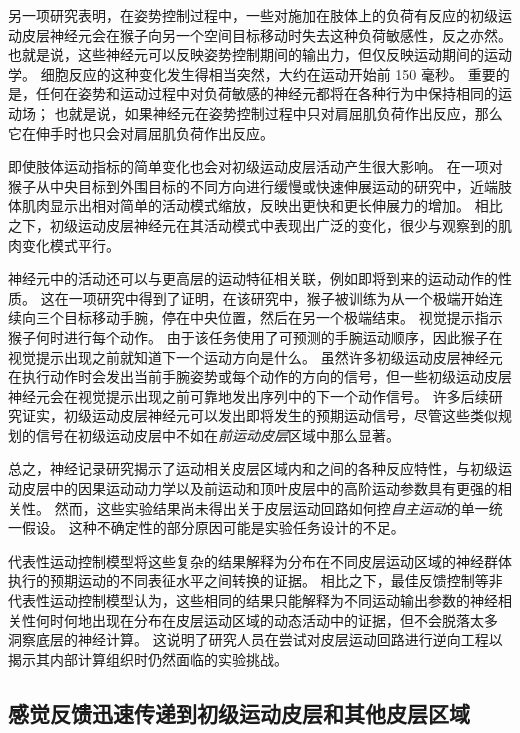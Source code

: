 另一项研究表明，在姿势控制过程中，一些对施加在肢体上的负荷有反应的初级运动皮层神经元会在猴子向另一个空间目标移动时失去这种负荷敏感性，反之亦然。
也就是说，这些神经元可以反映姿势控制期间的输出力，但仅反映运动期间的运动学。
细胞反应的这种变化发生得相当突然，大约在运动开始前 150 毫秒。
重要的是，任何在姿势和运动过程中对负荷敏感的神经元都将在各种行为中保持相同的运动场；
也就是说，如果神经元在姿势控制过程中只对肩屈肌负荷作出反应，那么它在伸手时也只会对肩屈肌负荷作出反应。


即使肢体运动指标的简单变化也会对初级运动皮层活动产生很大影响。
在一项对猴子从中央目标到外围目标的不同方向进行缓慢或快速伸展运动的研究中，近端肢体肌肉显示出相对简单的活动模式缩放，反映出更快和更长伸展力的增加。
相比之下，初级运动皮层神经元在其活动模式中表现出广泛的变化，很少与观察到的肌肉变化模式平行。


神经元中的活动还可以与更高层的运动特征相关联，例如即将到来的运动动作的性质。 
这在一项研究中得到了证明，在该研究中，猴子被训练为从一个极端开始连续向三个目标移动手腕，停在中央位置，然后在另一个极端结束。
视觉提示指示猴子何时进行每个动作。
由于该任务使用了可预测的手腕运动顺序，因此猴子在视觉提示出现之前就知道下一个运动方向是什么。
虽然许多初级运动皮层神经元在执行动作时会发出当前手腕姿势或每个动作的方向的信号，但一些初级运动皮层神经元会在视觉提示出现之前可靠地发出序列中的下一个动作信号。
许多后续研究证实，初级运动皮层神经元可以发出即将发生的预期运动信号，尽管这些类似规划的信号在初级运动皮层中不如在\textit{前运动皮层}区域中那么显著。


总之，神经记录研究揭示了运动相关皮层区域内和之间的各种反应特性，与初级运动皮层中的因果运动动力学以及前运动和顶叶皮层中的高阶运动参数具有更强的相关性。
然而，这些实验结果尚未得出关于皮层运动回路如何控\textit{自主运动}的单一统一假设。
这种不确定性的部分原因可能是实验任务设计的不足。


代表性运动控制模型将这些复杂的结果解释为分布在不同皮层运动区域的神经群体执行的预期运动的不同表征水平之间转换的证据。
相比之下，最佳反馈控制等非代表性运动控制模型认为，这些相同的结果只能解释为不同运动输出参数的神经相关性何时何地出现在分布在皮层运动区域的动态活动中的证据，但不会脱落太多 洞察底层的神经计算。
这说明了研究人员在尝试对皮层运动回路进行逆向工程以揭示其内部计算组织时仍然面临的实验挑战。



\subsection{感觉反馈迅速传递到初级运动皮层和其他皮层区域}

